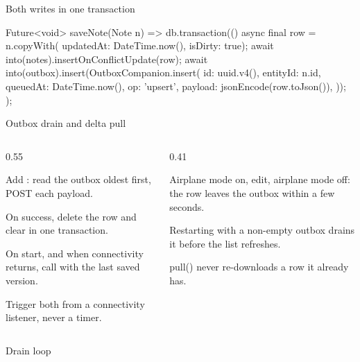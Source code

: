 \documentclass[10pt,aspectratio=169,t]{beamer}
\begin{document}
\begin{frame}[fragile,eyebrow=Task I]{Both writes in one transaction}
  \vskip 1mm
\begin{dart}
Future<void> saveNote(Note n) => db.transaction(() async {
  final row = n.copyWith(
      updatedAt: DateTime.now(), isDirty: true);
  await into(notes).insertOnConflictUpdate(row);
  await into(outbox).insert(OutboxCompanion.insert(
    id: uuid.v4(), entityId: n.id, queuedAt: DateTime.now(),
    op: 'upsert', payload: jsonEncode(row.toJson()),
  ));
});
\end{dart}
\end{frame}

\begin{frame}[eyebrow=Task II]{Outbox drain and delta pull}
  \begin{columns}[T]
    \begin{column}{0.55\textwidth}
      \begin{steps}
        \item Add : read the outbox oldest first, POST each payload.
        \item On success, delete the row and clear  in one transaction.
        \item On start, and when connectivity returns, call  with the last saved version.
        \item Trigger both from a connectivity listener, never a timer.
      \end{steps}
    \end{column}
    \begin{column}{0.41\textwidth}
      \begin{checklist}
        \item Airplane mode on, edit, airplane mode off: the row leaves the outbox within a few seconds.
        \item Restarting with a non-empty outbox drains it before the list refreshes.
        \item pull() never re-downloads a row it already has.
      \end{checklist}
    \end{column}
  \end{columns}
\end{frame}

\begin{frame}[fragile,eyebrow=Task II]{Drain loop}
\end{frame}
\end{document}
